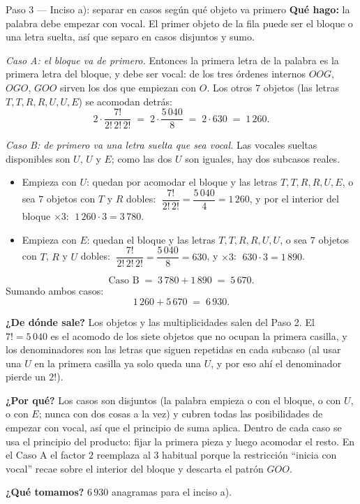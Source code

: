 \documentclass[11pt]{article}
\begin{document}
\begin{paso}{Paso 3 --- Inciso a): separar en casos según qué objeto va primero}
\textbf{Qué hago:} la palabra debe empezar con vocal. El primer objeto de la fila puede ser el bloque o una
letra suelta, así que separo en casos disjuntos y sumo.

\emph{Caso A: el bloque va de primero.} Entonces la primera letra de la palabra es la primera letra del
bloque, y debe ser vocal: de los tres órdenes internos $OOG$, $OGO$, $GOO$ sirven los dos que empiezan con
$O$. Los otros $7$ objetos (las letras $T,T,R,R,U,U,E$) se acomodan detrás:
\[
2\cdot\frac{7!}{2!\,2!\,2!} \;=\; 2\cdot\frac{5\,040}{8} \;=\; 2\cdot 630 \;=\; 1\,260 .
\]

\emph{Caso B: de primero va una letra suelta que sea vocal.} Las vocales sueltas disponibles son $U$, $U$ y
$E$; como las dos $U$ son iguales, hay dos subcasos reales.
\begin{itemize}[leftmargin=1.4em]
\item Empieza con $U$: quedan por acomodar el bloque y las letras $T,T,R,R,U,E$, o sea $7$ objetos con $T$ y
$R$ dobles:
$\;\dfrac{7!}{2!\,2!}=\dfrac{5\,040}{4}=1\,260$, y por el interior del bloque $\times 3$:
$\;1\,260\cdot 3 = 3\,780$.
\item Empieza con $E$: quedan el bloque y las letras $T,T,R,R,U,U$, o sea $7$ objetos con $T$, $R$ y $U$
dobles: $\;\dfrac{7!}{2!\,2!\,2!}=\dfrac{5\,040}{8}=630$, y $\times 3$: $\;630\cdot 3 = 1\,890$.
\end{itemize}
\[
\text{Caso B} \;=\; 3\,780 + 1\,890 \;=\; 5\,670 .
\]
Sumando ambos casos:
\[
1\,260 + 5\,670 \;=\; 6\,930 .
\]

\textbf{¿De dónde sale?} Los objetos y las multiplicidades salen del Paso 2. El $7!=5\,040$ es el acomodo de
los siete objetos que no ocupan la primera casilla, y los denominadores son las letras que siguen repetidas
en cada subcaso (al usar una $U$ en la primera casilla ya solo queda una $U$, y por eso ahí el denominador
pierde un $2!$).

\textbf{¿Por qué?} Los casos son disjuntos (la palabra empieza o con el bloque, o con $U$, o con $E$; nunca
con dos cosas a la vez) y cubren todas las posibilidades de empezar con vocal, así que el principio de suma
aplica. Dentro de cada caso se usa el principio del producto: fijar la primera pieza y luego acomodar el
resto. En el Caso A el factor $2$ reemplaza al $3$ habitual porque la restricción ``inicia con vocal'' recae
sobre el interior del bloque y descarta el patrón $GOO$.

\textbf{¿Qué tomamos?} $6\,930$ anagramas para el inciso a).
\end{paso}
\end{document}
